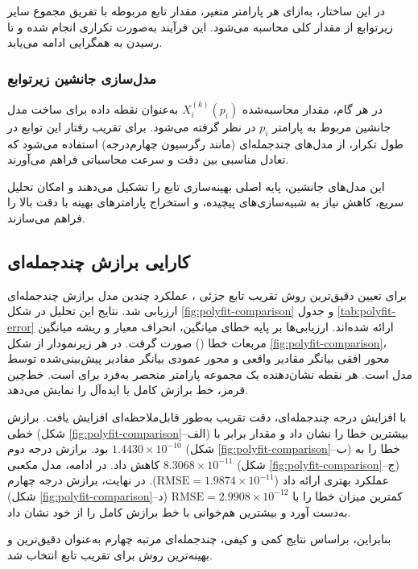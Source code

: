 در این ساختار، به‌ازای هر پارامتر متغیر، مقدار تابع مربوطه با تفریق مجموع سایر زیرتوابع از مقدار کلی  محاسبه می‌شود. این فرآیند به‌صورت تکراری انجام شده و تا رسیدن به همگرایی ادامه می‌یابد.


\subsubsection{مدل‌سازی جانشین زیرتوابع}

در هر گام، مقدار محاسبه‌شده $X_i^{(k)}(p_i)$ به‌عنوان نقطه داده برای ساخت مدل جانشین مربوط به پارامتر $p_i$ در نظر گرفته می‌شود. برای تقریب رفتار این توابع در طول تکرار، از مدل‌های چندجمله‌ای (مانند رگرسیون چهارم‌درجه) استفاده می‌شود که تعادل مناسبی بین دقت و سرعت محاسباتی فراهم می‌آورند.

این مدل‌های جانشین، پایه اصلی بهینه‌سازی تابع  را تشکیل می‌دهند و امکان تحلیل سریع، کاهش نیاز به شبیه‌سازی‌های پیچیده، و استخراج پارامترهای بهینه با دقت بالا را فراهم می‌سازند.


\subsection{کارایی برازش چندجمله‌ای}

برای تعیین دقیق‌ترین روش تقریب تابع جزئی ، عملکرد چندین مدل برازش چندجمله‌ای ارزیابی شد. نتایج این تحلیل در شکل \ref{fig:polyfit-comparison} و جدول \ref{tab:polyfit-error} ارائه شده‌اند. ارزیابی‌ها بر پایه خطای میانگین، انحراف معیار و ریشه میانگین مربعات خطا () صورت گرفت. در هر زیرنمودار از شکل \ref{fig:polyfit-comparison}، محور افقی بیانگر مقادیر واقعی  و محور عمودی بیانگر مقادیر پیش‌بینی‌شده توسط مدل است. هر نقطه نشان‌دهنده یک مجموعه پارامتر منحصر به‌فرد برای  است. خط‌چین قرمز، خط برازش کامل یا ایده‌آل را نمایش می‌دهد.

با افزایش درجه چندجمله‌ای، دقت تقریب به‌طور قابل‌ملاحظه‌ای افزایش یافت. برازش خطی (شکل \ref{fig:polyfit-comparison}–الف) بیشترین خطا را نشان داد و مقدار  برابر با $1.4430\times10^{-10}$ بود. برازش درجه دوم (شکل \ref{fig:polyfit-comparison}–ب) خطا را به $8.3068\times10^{-11}$ کاهش داد. در ادامه، مدل مکعبی (شکل \ref{fig:polyfit-comparison}–ج) عملکرد بهتری ارائه داد ($\mathrm{RMSE}=1.9874\times10^{-11}$). در نهایت، برازش درجه چهارم (شکل \ref{fig:polyfit-comparison}–د) کمترین میزان خطا را با $\mathrm{RMSE}=2.9908\times10^{-12}$ به‌دست آورد و بیشترین هم‌خوانی با خط برازش کامل را از خود نشان داد.

بنابراین، براساس نتایج کمی و کیفی، چندجمله‌ای مرتبه چهارم به‌عنوان دقیق‌ترین و بهینه‌ترین روش برای تقریب تابع  انتخاب شد.

